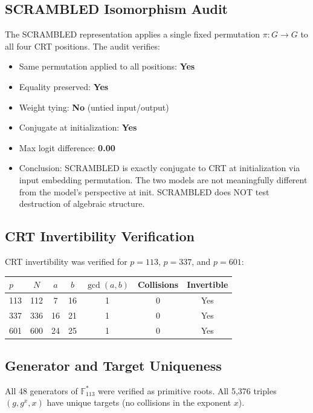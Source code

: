 \documentclass[11pt,a4paper]{article}
\begin{document}
\subsection{SCRAMBLED Isomorphism Audit}

The SCRAMBLED representation applies a single fixed permutation $\pi: G \to G$ to all four CRT positions. The audit verifies:

\begin{itemize}
\item Same permutation applied to all positions: \textbf{Yes}
\item Equality preserved: \textbf{Yes}
\item Weight tying: \textbf{No} (untied input/output)
\item Conjugate at initialization: \textbf{Yes}
\item Max logit difference: \textbf{0.00}
\item Conclusion: SCRAMBLED is exactly conjugate to CRT at initialization via input embedding permutation. The two models are not meaningfully different from the model's perspective at init. SCRAMBLED does NOT test destruction of algebraic structure.
\end{itemize}

\subsection{CRT Invertibility Verification}

CRT invertibility was verified for $p = 113$, $p = 337$, and $p = 601$:

\begin{table}[h]
\centering
\begin{tabular}{lcccccc}
\toprule
$p$ & $N$ & $a$ & $b$ & $\gcd(a,b)$ & Collisions & Invertible \\
\midrule
113 & 112 & 7 & 16 & 1 & 0 & Yes \\
337 & 336 & 16 & 21 & 1 & 0 & Yes \\
601 & 600 & 24 & 25 & 1 & 0 & Yes \\
\bottomrule
\end{tabular}
\end{table}

\subsection{Generator and Target Uniqueness}

All 48 generators of $\mathbb{F}_{113}^*$ were verified as primitive roots. All 5,376 triples $(g, g^x, x)$ have unique targets (no collisions in the exponent $x$).
\end{document}
